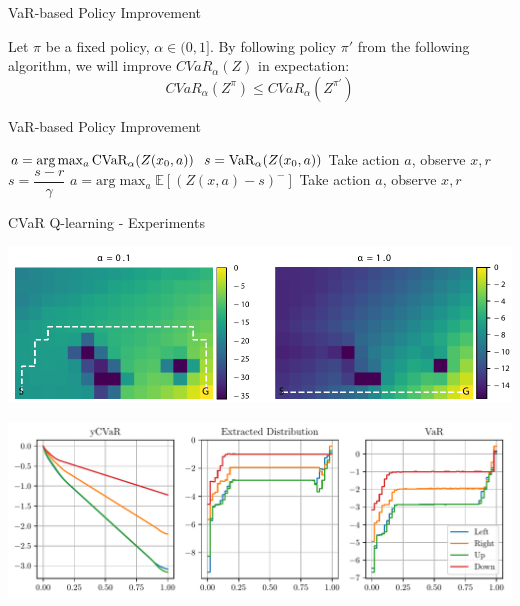 \documentclass{beamer}
\begin{document}
\begin{frame}{VaR-based Policy Improvement}
\begin{theorem}
Let $\pi$ be a fixed policy, $\alpha \in (0, 1]$. By following policy $\pi'$ from the following algorithm, we will improve $CVaR_\alpha(Z)$ in expectation: $$CVaR_\alpha(Z^\pi) \le CVaR_\alpha(Z^{\pi'})$$
\end{theorem}
\begin{block}{VaR-based Policy Improvement}
\begin{algorithmic}
    \STATE $a = \text{arg}\max_a \text{CVaR}_\alpha(Z(x_0, a))$
    \STATE $s = \text{VaR}_\alpha(Z(x_0, a))$
    \STATE Take action $a$, observe $x, r$
    	\STATE $s = \dfrac{s-r}{\gamma}$
    	\STATE $a = \text{arg}\max_a \mathbb{E}\left[(Z(x, a)-s)^- \right]$
    	\STATE Take action $a$, observe $x, r$
   	\ENDWHILE
\end{algorithmic}
\end{block}
\end{frame}




\begin{frame}{CVaR Q-learning - Experiments}

\center
\includegraphics[width=0.9\linewidth]{gfx/q_optimal_paths.pdf}

\includegraphics[width=0.8\linewidth]{../gfx/nonconvex.pdf}
\end{frame}
\end{document}
